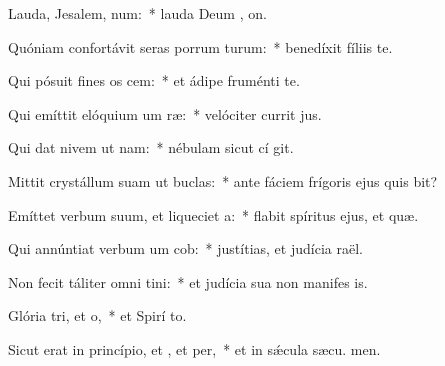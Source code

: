 \item Lauda, Jesalem, num:~* lauda Deum , on.
\item Quóniam confortávit seras porrum turum:~* benedíxit fíliis   te.
\item Qui pósuit fines os cem:~* et ádipe fruménti  te.
\item Qui emíttit elóquium um ræ:~* velóciter currit  jus.
\item Qui dat nivem ut nam:~* nébulam sicut cí git.
\item Mittit crystállum suam ut buclas:~* ante fáciem frígoris ejus quis bit?
\item Emíttet verbum suum, et liqueciet a:~* flabit spíritus ejus, et  quæ.
\item Qui annúntiat verbum um cob:~* justítias, et judícia  raël.
\item Non fecit táliter omni tini:~* et judícia sua non manifes is.
\item Glória tri, et o,~* et Spirí to.
\item Sicut erat in princípio, et , et per,~* et in sǽcula sæcu. men.
